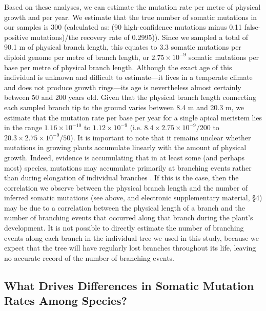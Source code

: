 Based on these analyses, we can estimate the mutation rate per metre of physical growth and per year. We estimate that the true number of somatic mutations in our samples is 300 (calculated as: (90 high-confidence mutations minus 0.11 false-positive mutations)/the recovery rate of 0.2995)). Since we sampled a total of 90.1 m of physical branch length, this equates to 3.3 somatic mutations per diploid genome per metre of branch length, or $2.75 \times 10^{-9}$ somatic mutations per base per metre of physical branch length. Although the exact age of this individual is unknown and difficult to estimate---it lives in a temperate climate and does not produce growth rings---its age is nevertheless almost certainly between 50 and 200 years old. Given that the physical branch length connecting each sampled branch tip to the ground varies between 8.4 m and 20.3 m, we estimate that the mutation rate per base per year for a single apical meristem lies in the range $1.16 \times 10^{-10}$ to $1.12 \times 10^{-9}$ (i.e. $8.4 \times 2.75 \times 10^{-9}/200$ to $20.3 \times 2.75 \times 10^{-9}/50$). It is important to note that it remains unclear whether mutations in growing plants accumulate linearly with the amount of physical growth. Indeed, evidence is accumulating that in at least some (and perhaps most) species, mutations may accumulate primarily at branching events rather than during elongation of individual branches \parencite{watson_germline_2016,burian_patterns_2016}. If this is the case, then the correlation we observe between the physical branch length and the number of inferred somatic mutations (see above, and electronic supplementary material, §4) may be due to a correlation between the physical length of a branch and the number of branching events that occurred along that branch during the plant's development. It is not possible to directly estimate the number of branching events along each branch in the individual tree we used in this study, because we expect that the tree will have regularly lost branches throughout its life, leaving no accurate record of the number of branching events.

\subsection{What Drives Differences in Somatic Mutation Rates Among Species?}

